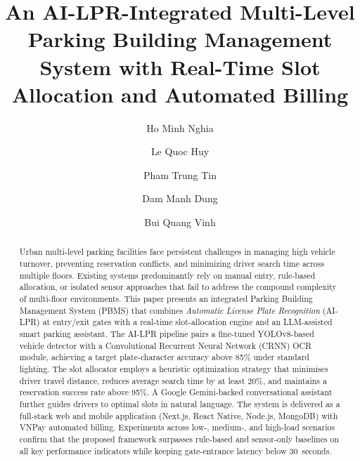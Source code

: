 \documentclass[runningheads]{llncs}
\begin{document}
\title{An AI-LPR-Integrated Multi-Level Parking Building Management System with Real-Time Slot Allocation and Automated Billing}


\author{
  Ho Minh Nghia \and
  Le Quoc Huy \and
  Pham Trung Tin \and
  Dam Manh Dung \and
  Bui Quang Vinh
}



\maketitle

\begin{abstract}
Urban multi-level parking facilities face persistent challenges
in managing high vehicle turnover, preventing reservation
conflicts, and minimizing driver search time across multiple
floors. Existing systems predominantly rely on manual entry,
rule-based allocation, or isolated sensor approaches that fail
to address the compound complexity of multi-floor environments.
This paper presents an integrated Parking Building Management
System (PBMS) that combines \emph{Automatic License Plate
Recognition} (AI-LPR) at entry/exit gates with a real-time
slot-allocation engine and an LLM-assisted smart parking
assistant. The AI-LPR pipeline pairs a fine-tuned
YOLOv8-based vehicle detector with a Convolutional
Recurrent Neural Network (CRNN) OCR module, achieving a
target plate-character accuracy above 85\% under standard
lighting. The slot allocator employs a heuristic optimization
strategy that minimises driver travel distance, reduces average
search time by at least 20\%, and maintains a reservation
success rate above 95\%. A Google Gemini-backed conversational
assistant further guides drivers to optimal slots in natural
language. The system is delivered as a full-stack web and
mobile application (Next.js, React Native, Node.js,
MongoDB) with VNPay automated billing. Experiments across
low-, medium-, and high-load scenarios confirm that the
proposed framework surpasses rule-based and sensor-only
baselines on all key performance indicators while keeping
gate-entrance latency below 30~seconds.

\end{abstract}
\end{document}
